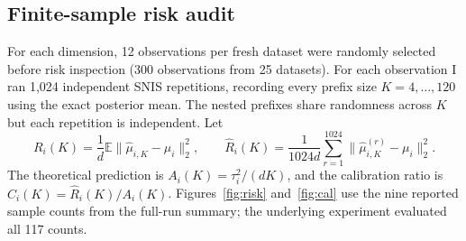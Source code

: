 \documentclass[10pt,letterpaper]{article}
\newcommand{\E}{\mathbb E}
\newcommand{\norm}[1]{\lVert #1\rVert_2}
\begin{document}
\subsection{Finite-sample risk audit}
For each dimension, 12 observations per fresh dataset were randomly selected before risk inspection (300 observations from 25 datasets). For each observation I ran 1,024 independent SNIS repetitions, recording every prefix size $K=4,\ldots,120$ using the exact posterior mean. The nested prefixes share randomness across $K$ but each repetition is independent. Let
\begin{equation}
 R_i(K)=\frac1d\E\norm{\widehat\mu_{i,K}-\mu_i}^{2},\qquad
 \widehat R_i(K)=\frac{1}{1024d}\sum_{r=1}^{1024}\norm{\widehat\mu^{(r)}_{i,K}-\mu_i}^{2}.
\end{equation}
The theoretical prediction is $A_i(K)=\tau_i^2/(dK)$, and the calibration ratio is $C_i(K)=\widehat R_i(K)/A_i(K)$. Figures~\ref{fig:risk} and~\ref{fig:cal} use the nine reported sample counts from the full-run summary; the underlying experiment evaluated all 117 counts.
\end{document}
